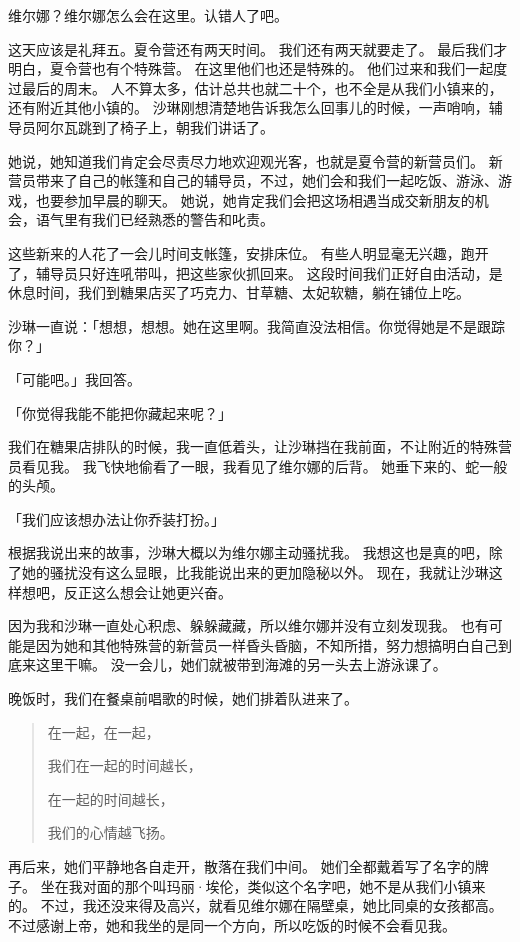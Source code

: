 \documentclass[UTF8]{ctexart}
\begin{document}
维尔娜？维尔娜怎么会在这里。认错人了吧。

这天应该是礼拜五。夏令营还有两天时间。
我们还有两天就要走了。
最后我们才明白，夏令营也有个特殊营。
在这里他们也还是特殊的。
他们过来和我们一起度过最后的周末。
人不算太多，估计总共也就二十个，也不全是从我们小镇来的，还有附近其他小镇的。
沙琳刚想清楚地告诉我怎么回事儿的时候，一声哨响，辅导员阿尔瓦跳到了椅子上，朝我们讲话了。

她说，她知道我们肯定会尽责尽力地欢迎观光客，也就是夏令营的新营员们。
新营员带来了自己的帐篷和自己的辅导员，不过，她们会和我们一起吃饭、游泳、游戏，也要参加早晨的聊天。
她说，她肯定我们会把这场相遇当成交新朋友的机会，语气里有我们已经熟悉的警告和叱责。

这些新来的人花了一会儿时间支帐篷，安排床位。
有些人明显毫无兴趣，跑开了，辅导员只好连吼带叫，把这些家伙抓回来。
这段时间我们正好自由活动，是休息时间，我们到糖果店买了巧克力、甘草糖、太妃软糖，躺在铺位上吃。

沙琳一直说：「想想，想想。她在这里啊。我简直没法相信。你觉得她是不是跟踪你？」

「可能吧。」我回答。

「你觉得我能不能把你藏起来呢？」

我们在糖果店排队的时候，我一直低着头，让沙琳挡在我前面，不让附近的特殊营员看见我。
我飞快地偷看了一眼，我看见了维尔娜的后背。
她垂下来的、蛇一般的头颅。

「我们应该想办法让你乔装打扮。」

根据我说出来的故事，沙琳大概以为维尔娜主动骚扰我。
我想这也是真的吧，除了她的骚扰没有这么显眼，比我能说出来的更加隐秘以外。
现在，我就让沙琳这样想吧，反正这么想会让她更兴奋。

因为我和沙琳一直处心积虑、躲躲藏藏，所以维尔娜并没有立刻发现我。
也有可能是因为她和其他特殊营的新营员一样昏头昏脑，不知所措，努力想搞明白自己到底来这里干嘛。
没一会儿，她们就被带到海滩的另一头去上游泳课了。

晚饭时，我们在餐桌前唱歌的时候，她们排着队进来了。

\begin{verse}
    在一起，在一起，
    
    我们在一起的时间越长，

    在一起的时间越长，

    我们的心情越飞扬。
\end{verse}

再后来，她们平静地各自走开，散落在我们中间。
她们全都戴着写了名字的牌子。
坐在我对面的那个叫玛丽·埃伦，类似这个名字吧，她不是从我们小镇来的。
不过，我还没来得及高兴，就看见维尔娜在隔壁桌，她比同桌的女孩都高。
不过感谢上帝，她和我坐的是同一个方向，所以吃饭的时候不会看见我。
\end{document}
